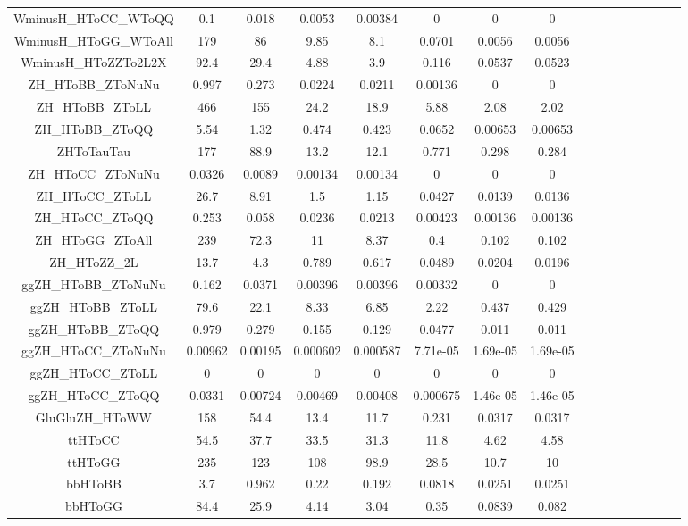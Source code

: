 \begin{table}
\begin{adjustbox}{max width=\textwidth}
\begin{tabular}{  c c c c c c c c c c c c cccc}
WminusH\_HToCC\_WToQQ & 0.1 & 0.018 & 0.0053 & 0.00384 & 0 & 0 & 0 \\ 
WminusH\_HToGG\_WToAll & 179 & 86 & 9.85 & 8.1 & 0.0701 & 0.0056 & 0.0056 \\ 
WminusH\_HToZZTo2L2X & 92.4 & 29.4 & 4.88 & 3.9 & 0.116 & 0.0537 & 0.0523 \\ 
\hline 
ZH\_HToBB\_ZToNuNu & 0.997 & 0.273 & 0.0224 & 0.0211 & 0.00136 & 0 & 0 \\ 
ZH\_HToBB\_ZToLL & 466 & 155 & 24.2 & 18.9 & 5.88 & 2.08 & 2.02 \\ 
ZH\_HToBB\_ZToQQ & 5.54 & 1.32 & 0.474 & 0.423 & 0.0652 & 0.00653 & 0.00653 \\ 
ZHToTauTau & 177 & 88.9 & 13.2 & 12.1 & 0.771 & 0.298 & 0.284 \\ 
ZH\_HToCC\_ZToNuNu & 0.0326 & 0.0089 & 0.00134 & 0.00134 & 0 & 0 & 0 \\ 
ZH\_HToCC\_ZToLL & 26.7 & 8.91 & 1.5 & 1.15 & 0.0427 & 0.0139 & 0.0136 \\ 
ZH\_HToCC\_ZToQQ & 0.253 & 0.058 & 0.0236 & 0.0213 & 0.00423 & 0.00136 & 0.00136 \\ 
ZH\_HToGG\_ZToAll & 239 & 72.3 & 11 & 8.37 & 0.4 & 0.102 & 0.102 \\ 
ZH\_HToZZ\_2L & 13.7 & 4.3 & 0.789 & 0.617 & 0.0489 & 0.0204 & 0.0196 \\ 
\hline 
ggZH\_HToBB\_ZToNuNu & 0.162 & 0.0371 & 0.00396 & 0.00396 & 0.00332 & 0 & 0 \\ 
ggZH\_HToBB\_ZToLL & 79.6 & 22.1 & 8.33 & 6.85 & 2.22 & 0.437 & 0.429 \\ 
ggZH\_HToBB\_ZToQQ & 0.979 & 0.279 & 0.155 & 0.129 & 0.0477 & 0.011 & 0.011 \\ 
ggZH\_HToCC\_ZToNuNu & 0.00962 & 0.00195 & 0.000602 & 0.000587 & 7.71e-05 & 1.69e-05 & 1.69e-05 \\ 
ggZH\_HToCC\_ZToLL & 0 & 0 & 0 & 0 & 0 & 0 & 0 \\ 
ggZH\_HToCC\_ZToQQ & 0.0331 & 0.00724 & 0.00469 & 0.00408 & 0.000675 & 1.46e-05 & 1.46e-05 \\ 
GluGluZH\_HToWW & 158 & 54.4 & 13.4 & 11.7 & 0.231 & 0.0317 & 0.0317 \\ 
\hline 
ttHToCC & 54.5 & 37.7 & 33.5 & 31.3 & 11.8 & 4.62 & 4.58 \\ 
ttHToGG & 235 & 123 & 108 & 98.9 & 28.5 & 10.7 & 10 \\ 
\hline 
bbHToBB & 3.7 & 0.962 & 0.22 & 0.192 & 0.0818 & 0.0251 & 0.0251 \\ 
bbHToGG & 84.4 & 25.9 & 4.14 & 3.04 & 0.35 & 0.0839 & 0.082 \\ 

\end{tabular}
\end{adjustbox}
\end{table}
